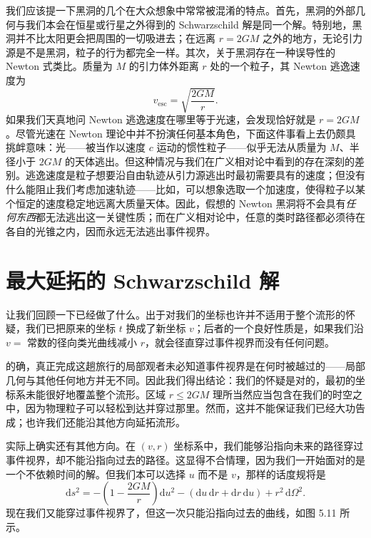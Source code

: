 我们应该提一下黑洞的几个在大众想象中常常被混淆的特点。首先，黑洞的外部几何与我们本会在恒星或行星之外得到的 Schwarzschild 解是同一个解。特别地，黑洞并不比太阳更会把周围的一切吸进去；在远离 $r = 2GM$ 之外的地方，无论引力源是不是黑洞，粒子的行为都完全一样。其次，关于黑洞存在一种误导性的 Newton 式类比。质量为 $M$ 的引力体外距离 $r$ 处的一个粒子，其 Newton 逃逸速度为
\begin{equation*}
v_{\mathrm{esc}} = \sqrt{\frac{2GM}{r}}.
\tag{5.114}
\end{equation*}
如果我们天真地问 Newton 逃逸速度在哪里等于光速，会发现恰好就是 $r = 2GM$。尽管光速在 Newton 理论中并不扮演任何基本角色，下面这件事看上去仍颇具挑衅意味：光——被当作以速度 $c$ 运动的惯性粒子——似乎无法从质量为 $M$、半径小于 $2GM$ 的天体逃出。但这种情况与我们在广义相对论中看到的存在深刻的差别。逃逸速度是粒子想要沿自由轨迹从引力源逃出时最初需要具有的速度；但没有什么能阻止我们考虑加速轨迹——比如，可以想象选取一个加速度，使得粒子以某个恒定的速度稳定地远离大质量天体。因此，假想的 Newton 黑洞将不会具有\emph{任何东西}都无法逃出这一关键性质；而在广义相对论中，任意的类时路径都必须待在各自的光锥之内，因而永远无法逃出事件视界。

\section{最大延拓的 Schwarzschild 解}

让我们回顾一下已经做了什么。出于对我们的坐标也许并不适用于整个流形的怀疑，我们已把原来的坐标 $t$ 换成了新坐标 $v$；后者的一个良好性质是，如果我们沿 $v =$ 常数的径向类光曲线减小 $r$，就会径直穿过事件视界而没有任何问题。

的确，真正完成这趟旅行的局部观者未必知道事件视界是在何时被越过的——局部几何与其他任何地方并无不同。因此我们得出结论：我们的怀疑是对的，最初的坐标系未能很好地覆盖整个流形。区域 $r \leq 2GM$ 理所当然应当包含在我们的时空之中，因为物理粒子可以轻松到达并穿过那里。然而，这并不能保证我们已经大功告成；也许我们还能沿其他方向延拓流形。

实际上确实还有其他方向。在 $(v, r)$ 坐标系中，我们能够沿指向未来的路径穿过事件视界，却不能沿指向过去的路径。这显得不合情理，因为我们一开始面对的是一个不依赖时间的解。但我们本可以选择 $u$ 而不是 $v$，那样的话度规将是
\begin{equation*}
\mathrm{d}s^2 = -\left(1 - \frac{2GM}{r}\right)\mathrm{d}u^2 - \left(\mathrm{d}u\,\mathrm{d}r + \mathrm{d}r\,\mathrm{d}u\right) + r^2\,\mathrm{d}\Omega^2.
\tag{5.115}
\end{equation*}
现在我们又能穿过事件视界了，但这一次只能沿指向过去的曲线，如图 5.11 所示。


